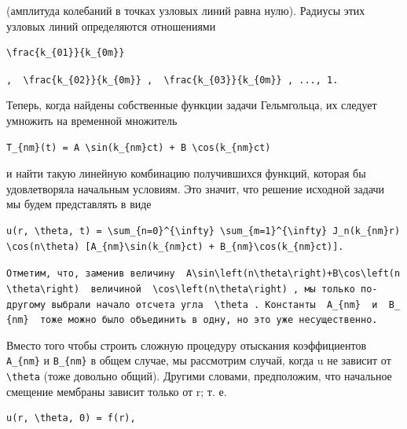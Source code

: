 \documentclass[
  ukrainian,
]{article}
\begin{document}
(амплитуда колебаний в точках узловых линий равна нулю). Радиусы этих
узловых линий определяются отношениями

\begin{verbatim}
\frac{k_{01}}{k_{0m}}
\end{verbatim}

\texttt{,\ \ \textquotesingle{}\textbackslash{}frac\{k\_\{02\}\}\{k\_\{0m\}\}\textquotesingle{}\ ,\ \ \textquotesingle{}\textbackslash{}frac\{k\_\{03\}\}\{k\_\{0m\}\}\textquotesingle{}\ ,\ ...,\ 1.}

Теперь, когда найдены собственные функции задачи Гельмгольца, их следует
умножить на временной множитель

\begin{verbatim}
T_{nm}(t) = A \sin(k_{nm}ct) + B \cos(k_{nm}ct)
\end{verbatim}

и найти такую линейную комбинацию получившихся функций, которая бы
удовлетворяла начальным условиям. Это значит, что решение исходной
задачи мы будем представлять в виде

\begin{verbatim}
u(r, \theta, t) = \sum_{n=0}^{\infty} \sum_{m=1}^{\infty} J_n(k_{nm}r) \cos(n\theta) [A_{nm}\sin(k_{nm}ct) + B_{nm}\cos(k_{nm}ct)].
\end{verbatim}

\texttt{Отметим,\ что,\ заменив\ величину\ \ \textquotesingle{}A\textbackslash{}sin\textbackslash{}left(n\textbackslash{}theta\textbackslash{}right)+B\textbackslash{}cos\textbackslash{}left(n\textbackslash{}theta\textbackslash{}right)\textquotesingle{}\ \ величиной\ \ \textquotesingle{}\textbackslash{}cos\textbackslash{}left(n\textbackslash{}theta\textbackslash{}right)\textquotesingle{}\ ,\ мы\ только\ по-другому\ выбрали\ начало\ отсчета\ угла\ \ \textquotesingle{}\textbackslash{}theta\textquotesingle{}\ .\ Константы\ \ \textquotesingle{}A\_\{nm\}\textquotesingle{}\ \ и\ \ \textquotesingle{}B\_\{nm\}\textquotesingle{}\ \ тоже\ можно\ было\ объединить\ в\ одну,\ но\ это\ уже\ несущественно.}

Вместо того чтобы строить сложную процедуру отыскания коэффициентов
\texttt{A\_\{nm\}} и \texttt{B\_\{nm\}} в общем случае, мы рассмотрим
случай, когда u не зависит от \texttt{\textbackslash{}theta} (тоже
довольно общий). Другими словами, предположим, что начальное смещение
мембраны зависит только от r; т. е.

\begin{verbatim}
u(r, \theta, 0) = f(r),
\end{verbatim}
\end{document}

